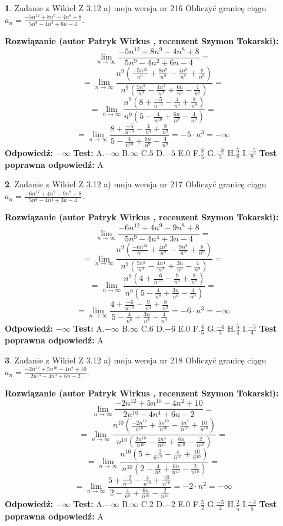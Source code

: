 \documentclass[12pt, a4paper]{article}
\theoremstyle{definition} %
\newtheorem{zad}{}
\newcommand{\zadStart}[1]{\begin{zad}#1\newline}
\newcommand{\zadStop}{\end{zad}}
\newcommand{\rozwStart}[2]{\noindent \textbf{Rozwiązanie (autor #1 , recenzent #2): }\newline}
\newcommand{\rozwStop}{\newline}
\newcommand{\odpStart}{\noindent \textbf{Odpowiedź:}\newline}
\newcommand{\odpStop}{\newline}
\newcommand{\testStart}{\noindent \textbf{Test:}\newline}
\newcommand{\testStop}{\newline}
\newcommand{\kluczStart}{\noindent \textbf{Test poprawna odpowiedź:}\newline}
\newcommand{\kluczStop}{\newline}
\begin{document}
\zadStart{Zadanie z Wikieł Z 3.12 a) moja wersja nr 216}
Obliczyć granicę ciągu $a_{n}=\frac{-5n^{12}+8n^{9}-4n^{8}+8}{5n^{9}-4n^{2}+6n-4}$.
\zadStop
\rozwStart{Patryk Wirkus}{Szymon Tokarski}
$$\lim\limits_{n\to\infty}\frac{-5n^{12}+8n^{9}-4n^{8}+8}{5n^{9}-4n^{2}+6n-4}=$$
$$=\lim\limits_{n\to\infty}\frac{n^{9}\left(\frac{-5n^{12}}{n^{9}}+\frac{8n^{9}}{n^{9}}-\frac{4n^{8}}{n^{9}}+\frac{8}{n^{9}}\right)}{n^{9}\left(\frac{5n^{9}}{n^{9}}-\frac{4n^{2}}{n^{9}}+\frac{6n}{n^{9}}-\frac{4}{n^{9}}\right)}=$$
$$=\lim\limits_{n\to\infty}\frac{n^{9}\left(8+\frac{-5}{n^{-3}}-\frac{4}{n^{4}}+\frac{8}{n^{9}}\right)}
{n^{9}\left(5-\frac{4}{n^{10}}+\frac{6n}{n^{9}}-\frac{4}{n^{9}}\right)}=$$
$$=\lim\limits_{n\to\infty}\frac{8+\frac{-5}{n^{-3}}-\frac{4}{n^{4}}+\frac{8}{n^{9}}}{5-\frac{4}{n^{10}}+\frac{6n}{n^{9}}-\frac{4}{n^{9}}}=-5\cdot n^{3} = -\infty$$
\rozwStop
\odpStart
$-\infty$
\odpStop
\testStart
A.$-\infty$
B.$\infty$
C.$5$
D.$-5$
E.$0$
F.$\frac{8}{5}$
G.$\frac{-8}{5}$
H.$\frac{5}{8}$
I.$\frac{-5}{8}$
\testStop
\kluczStart
A
\kluczStop



\zadStart{Zadanie z Wikieł Z 3.12 a) moja wersja nr 217}
Obliczyć granicę ciągu $a_{n}=\frac{-6n^{12}+4n^{9}-9n^{8}+8}{5n^{9}-4n^{4}+3n-4}$.
\zadStop
\rozwStart{Patryk Wirkus}{Szymon Tokarski}
$$\lim\limits_{n\to\infty}\frac{-6n^{12}+4n^{9}-9n^{8}+8}{5n^{9}-4n^{4}+3n-4}=$$
$$=\lim\limits_{n\to\infty}\frac{n^{9}\left(\frac{-6n^{12}}{n^{9}}+\frac{4n^{9}}{n^{9}}-\frac{9n^{8}}{n^{9}}+\frac{8}{n^{9}}\right)}{n^{9}\left(\frac{5n^{9}}{n^{9}}-\frac{4n^{4}}{n^{9}}+\frac{3n}{n^{9}}-\frac{4}{n^{9}}\right)}=$$
$$=\lim\limits_{n\to\infty}\frac{n^{9}\left(4+\frac{-6}{n^{-3}}-\frac{9}{n^{4}}+\frac{8}{n^{9}}\right)}
{n^{9}\left(5-\frac{4}{n^{8}}+\frac{3n}{n^{9}}-\frac{4}{n^{9}}\right)}=$$
$$=\lim\limits_{n\to\infty}\frac{4+\frac{-6}{n^{-3}}-\frac{9}{n^{4}}+\frac{8}{n^{9}}}{5-\frac{4}{n^{8}}+\frac{3n}{n^{9}}-\frac{4}{n^{9}}}=-6\cdot n^{3} = -\infty$$
\rozwStop
\odpStart
$-\infty$
\odpStop
\testStart
A.$-\infty$
B.$\infty$
C.$6$
D.$-6$
E.$0$
F.$\frac{4}{5}$
G.$\frac{-4}{5}$
H.$\frac{5}{4}$
I.$\frac{-5}{4}$
\testStop
\kluczStart
A
\kluczStop



\zadStart{Zadanie z Wikieł Z 3.12 a) moja wersja nr 218}
Obliczyć granicę ciągu $a_{n}=\frac{-2n^{12}+5n^{10}-4n^{2}+10}{2n^{10}-4n^{4}+6n-2}$.
\zadStop
\rozwStart{Patryk Wirkus}{Szymon Tokarski}
$$\lim\limits_{n\to\infty}\frac{-2n^{12}+5n^{10}-4n^{2}+10}{2n^{10}-4n^{4}+6n-2}=$$
$$=\lim\limits_{n\to\infty}\frac{n^{10}\left(\frac{-2n^{12}}{n^{10}}+\frac{5n^{10}}{n^{10}}-\frac{4n^{2}}{n^{10}}+\frac{10}{n^{10}}\right)}{n^{10}\left(\frac{2n^{10}}{n^{10}}-\frac{4n^{4}}{n^{10}}+\frac{6n}{n^{10}}-\frac{2}{n^{10}}\right)}=$$
$$=\lim\limits_{n\to\infty}\frac{n^{10}\left(5+\frac{-2}{n^{-2}}-\frac{4}{n^{10}}+\frac{10}{n^{10}}\right)}
{n^{10}\left(2-\frac{4}{n^{8}}+\frac{6n}{n^{10}}-\frac{2}{n^{10}}\right)}=$$
$$=\lim\limits_{n\to\infty}\frac{5+\frac{-2}{n^{-2}}-\frac{4}{n^{10}}+\frac{10}{n^{10}}}{2-\frac{4}{n^{8}}+\frac{6n}{n^{10}}-\frac{2}{n^{10}}}=-2\cdot n^{2} = -\infty$$
\rozwStop
\odpStart
$-\infty$
\odpStop
\testStart
A.$-\infty$
B.$\infty$
C.$2$
D.$-2$
E.$0$
F.$\frac{5}{2}$
G.$\frac{-5}{2}$
H.$\frac{2}{5}$
I.$\frac{-2}{5}$
\testStop
\kluczStart
A
\kluczStop
\end{document}
